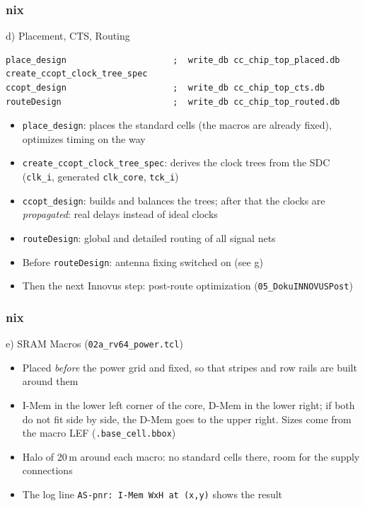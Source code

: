 \documentclass{beamer}
\newcommand{\astitle}{nix}
\newcommand{\assubtitle}{nix}
\newcommand{\cmd}[1]{\texttt{#1}}
\begin{document}
\renewcommand{\assubtitle}{d) Placement, CTS, Routing}
\begin{frame}[fragile]
\frametitle{\astitle}
\begin{block}{\assubtitle}
  \footnotesize
\begin{lstlisting}[style=sh]
place_design                     ;  write_db cc_chip_top_placed.db
create_ccopt_clock_tree_spec
ccopt_design                     ;  write_db cc_chip_top_cts.db
routeDesign                      ;  write_db cc_chip_top_routed.db
\end{lstlisting}
  \begin{itemize}
    \item \cmd{place\_design}: places the standard cells (the macros are
      already fixed), optimizes timing on the way
    \item \cmd{create\_ccopt\_clock\_tree\_spec}: derives the clock trees from
      the SDC (\cmd{clk\_i}, generated \cmd{clk\_core}, \cmd{tck\_i})
    \item \cmd{ccopt\_design}: builds and balances the trees; after that the
      clocks are \emph{propagated}: real delays instead of ideal clocks
    \item \cmd{routeDesign}: global and detailed routing of all signal nets
    \item Before \cmd{routeDesign}: antenna fixing switched on (see g)
    \item Then the next Innovus step: post-route optimization
      (\cmd{05\_DokuINNOVUSPost})
  \end{itemize}
\end{block}
\end{frame}

\renewcommand{\assubtitle}{e) SRAM Macros (\texttt{02a\_rv64\_power.tcl})}
\begin{frame}
\frametitle{\astitle}
\begin{block}{\assubtitle}
  \footnotesize
  \begin{itemize}
    \item Placed \emph{before} the power grid and fixed, so that stripes
      and row rails are built around them
    \item I-Mem in the lower left corner of the core, D-Mem in the lower
      right; if both do not fit side by side, the D-Mem goes to the upper
      right. Sizes come from the macro LEF (\cmd{.base\_cell.bbox})
    \item Halo of 20\,\textmu m around each macro: no standard cells
      there, room for the supply connections
    \item The log line \cmd{AS-pnr: I-Mem WxH at (x,y)} shows the result
  \end{itemize}
\end{block}
\end{frame}
\end{document}
